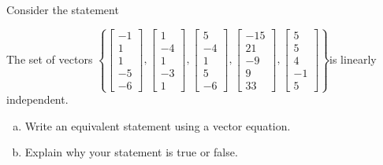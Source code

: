 
\begin{exerciseStatement}


Consider the statement 
\begin{center}\begin{minipage}{0.8\textwidth}
 The set of vectors \( \left\{ \left[\begin{array}{c}
-1 \\
1 \\
1 \\
-5 \\
-6
\end{array}\right] , \left[\begin{array}{c}
1 \\
-4 \\
1 \\
-3 \\
1
\end{array}\right] , \left[\begin{array}{c}
5 \\
-4 \\
1 \\
5 \\
-6
\end{array}\right] , \left[\begin{array}{c}
-15 \\
21 \\
-9 \\
9 \\
33
\end{array}\right] , \left[\begin{array}{c}
5 \\
5 \\
4 \\
-1 \\
5
\end{array}\right] \right\} \)is linearly independent.
\end{minipage}\end{center}
    


\begin{enumerate}[(a)]
\item  Write an equivalent statement using a vector equation.
\item  Explain why your statement is true or false.
\end{enumerate}
    
\end{exerciseStatement}
    
